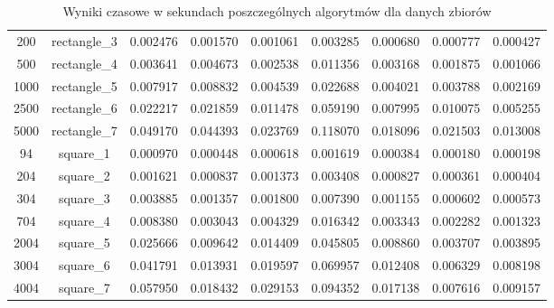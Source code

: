 \documentclass[a4paper,11pt]{article}
\begin{document}
\begin{center}
\begin{table}[h]
\begin{tabular}{|c|c|c|c|c|c|c|c|c|}
200 & rectangle_3 & 0.002476 & 0.001570 & 0.001061 & 0.003285 & 0.000680 & 0.000777 & 0.000427 \\
500 & rectangle_4 & 0.003641 & 0.004673 & 0.002538 & 0.011356 & 0.003168 & 0.001875 & 0.001066 \\
1000 & rectangle_5 & 0.007917 & 0.008832 & 0.004539 & 0.022688 & 0.004021 & 0.003788 & 0.002169 \\
2500 & rectangle_6 & 0.022217 & 0.021859 & 0.011478 & 0.059190 & 0.007995 & 0.010075 & 0.005255 \\
5000 & rectangle_7 & 0.049170 & 0.044393 & 0.023769 & 0.118070 & 0.018096 & 0.021503 & 0.013008 \\
94 & square_1 & 0.000970 & 0.000448 & 0.000618 & 0.001619 & 0.000384 & 0.000180 & 0.000198 \\
204 & square_2 & 0.001621 & 0.000837 & 0.001373 & 0.003408 & 0.000827 & 0.000361 & 0.000404 \\
304 & square_3 & 0.003885 & 0.001357 & 0.001800 & 0.007390 & 0.001155 & 0.000602 & 0.000573 \\
704 & square_4 & 0.008380 & 0.003043 & 0.004329 & 0.016342 & 0.003343 & 0.002282 & 0.001323 \\
2004 & square_5 & 0.025666 & 0.009642 & 0.014409 & 0.045805 & 0.008860 & 0.003707 & 0.003895 \\
3004 & square_6 & 0.041791 & 0.013931 & 0.019597 & 0.069957 & 0.012408 & 0.006329 & 0.008198 \\
4004 & square_7 & 0.057950 & 0.018432 & 0.029153 & 0.094352 & 0.017138 & 0.007616 & 0.009157 \\ \hline
\end{tabular}
\caption{Wyniki czasowe w sekundach poszczególnych algorytmów dla danych zbiorów}
\end{table}
\end{center}
\end{document}
